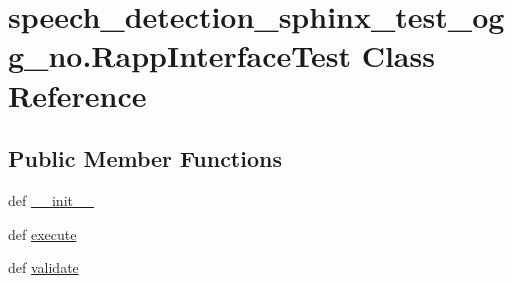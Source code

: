 \hypertarget{classspeech__detection__sphinx__test__ogg__no_1_1RappInterfaceTest}{\section{speech\-\_\-detection\-\_\-sphinx\-\_\-test\-\_\-ogg\-\_\-no.\-Rapp\-Interface\-Test Class Reference}
\label{classspeech__detection__sphinx__test__ogg__no_1_1RappInterfaceTest}
}
\subsection*{Public Member Functions}
\begin{DoxyCompactItemize}
\item 
def \hyperlink{classspeech__detection__sphinx__test__ogg__no_1_1RappInterfaceTest_a5e23cbb7dbfc08ccfd0cfc5ac4e14379}{\-\_\-\-\_\-init\-\_\-\-\_\-}
\item 
def \hyperlink{classspeech__detection__sphinx__test__ogg__no_1_1RappInterfaceTest_a77ac9f3b895d13f3bac326db0f98e602}{execute}
\item 
def \hyperlink{classspeech__detection__sphinx__test__ogg__no_1_1RappInterfaceTest_ad8345df57093e13d29acaae29963980a}{validate}
\end{DoxyCompactItemize}
